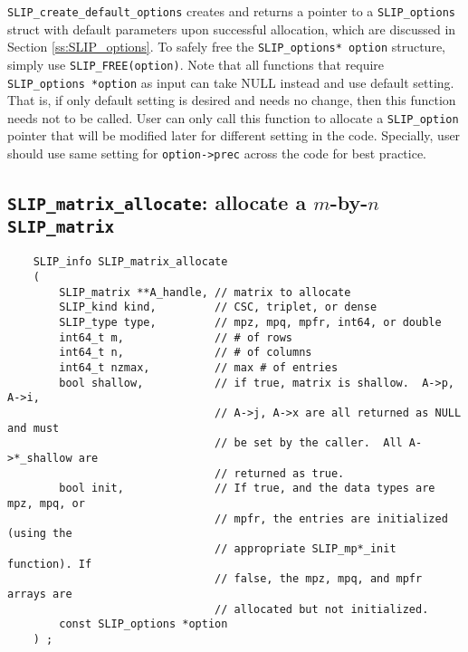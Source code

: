 \documentclass[12pt]{article}
\theoremstyle{definition}
\begin{document}
\verb|SLIP_create_default_options| creates and returns a pointer to a
\verb|SLIP_options| struct with default parameters upon successful allocation,
which are discussed in Section \ref{ss:SLIP_options}.  To safely free the
\verb|SLIP_options* option| structure, simply use \verb|SLIP_FREE(option)|.
Note that all functions that require \verb|SLIP_options *option| as input can
take NULL instead and use default setting. That is, if only default setting is
desired and needs no change, then this function needs not to be called. User
can only call this function to allocate a \verb|SLIP_option| pointer that will
be modified later for different setting in the code.
Specially, user should use same setting for \verb|option->prec| across the
code for best practice.

\cprotect\subsection{\verb|SLIP_matrix_allocate|: allocate a $m$-by-$n$
\verb|SLIP_matrix|}
\label{s:user:matrix_allocate}

\begin{mdframed}[userdefinedwidth=6in]
{\footnotesize
\begin{verbatim}
    SLIP_info SLIP_matrix_allocate
    (
        SLIP_matrix **A_handle, // matrix to allocate
        SLIP_kind kind,         // CSC, triplet, or dense
        SLIP_type type,         // mpz, mpq, mpfr, int64, or double
        int64_t m,              // # of rows
        int64_t n,              // # of columns
        int64_t nzmax,          // max # of entries
        bool shallow,           // if true, matrix is shallow.  A->p, A->i,
                                // A->j, A->x are all returned as NULL and must
                                // be set by the caller.  All A->*_shallow are
                                // returned as true.
        bool init,              // If true, and the data types are mpz, mpq, or
                                // mpfr, the entries are initialized (using the
                                // appropriate SLIP_mp*_init function). If
                                // false, the mpz, mpq, and mpfr arrays are
                                // allocated but not initialized.
        const SLIP_options *option
    ) ;
\end{verbatim}
} \end{mdframed}
\end{document}
